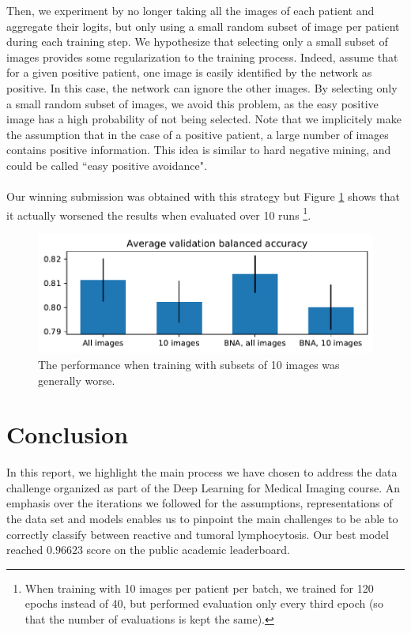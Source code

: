 \documentclass[final]{cvpr}
\begin{document}
	\noindent
	Then, we experiment by no longer taking all the images of each patient and aggregate their logits, but only using a small random subset of image per patient during each training step. We hypothesize that selecting only a small subset of images provides some regularization to the training process. Indeed, assume that for a given positive patient, one image is easily identified by the network as positive. In this case, the network can ignore the other images. By selecting only a small random subset of images, we avoid this problem, as the easy positive image has a high probability of not being selected. Note that we implicitely make the assumption that in the case of a positive patient, a large number of images contains positive information. This idea is similar to hard negative mining, and could be called ``easy positive avoidance".\\
	\\
	Our winning submission was obtained with this strategy but Figure \ref{fig:num_img} shows that it actually worsened the results when evaluated over 10 runs \footnote{When training with 10 images per patient per batch, we trained for 120 epochs instead of 40, but performed evaluation only every third epoch (so that the number of evaluations is kept the same).}.
	
	\begin{figure}[t]
		\begin{center}
			\includegraphics[width=0.95\linewidth]{fig/num_img_bal_acc.pdf}
		\end{center}
		\caption{The performance when training with subsets of 10 images was generally worse.}
		\label{fig:num_img}
	\end{figure}

	
	\section{Conclusion}
	
	In this report, we highlight the main process we have chosen to address the data challenge organized as part of the Deep Learning for Medical Imaging course. An emphasis over the iterations we followed for the assumptions, representations of the data set and models enables us to pinpoint the main challenges to be able to correctly classify between reactive and tumoral lymphocytosis. Our best model reached $0.96623$ score on the public academic leaderboard.
	
\end{document}
